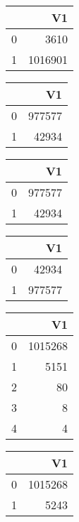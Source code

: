 \bigskip\bigskip
\centering
\begin{tabular}{rr}
  \hline
 & V1 \\ 
  \hline
0 & 3610 \\ 
  1 & 1016901 \\ 
   \hline
\end{tabular}

\bigskip\bigskip
\centering
\begin{tabular}{rr}
  \hline
 & V1 \\ 
  \hline
0 & 977577 \\ 
  1 & 42934 \\ 
   \hline
\end{tabular}

\bigskip\bigskip
\centering
\begin{tabular}{rr}
  \hline
 & V1 \\ 
  \hline
0 & 977577 \\ 
  1 & 42934 \\ 
   \hline
\end{tabular}

\bigskip\bigskip
\centering
\begin{tabular}{rr}
  \hline
 & V1 \\ 
  \hline
0 & 42934 \\ 
  1 & 977577 \\ 
   \hline
\end{tabular}

\bigskip\bigskip
\centering
\begin{tabular}{rr}
  \hline
 & V1 \\ 
  \hline
0 & 1015268 \\ 
  1 & 5151 \\ 
  2 &  80 \\ 
  3 &   8 \\ 
  4 &   4 \\ 
   \hline
\end{tabular}

\bigskip\bigskip
\centering
\begin{tabular}{rr}
  \hline
 & V1 \\ 
  \hline
0 & 1015268 \\ 
  1 & 5243 \\ 
   \hline
\end{tabular}

